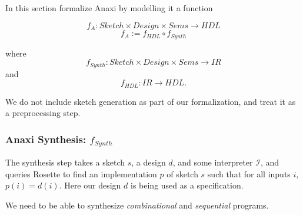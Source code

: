 In this section formalize Anaxi by modelling it a function 

$$f_A : Sketch \times Design \times Sems \to HDL$$
$$f_A := f_{HDL} \circ f_{Synth}$$

where
$$f_{Synth} : Sketch \times Design \times Sems \to IR$$
and
$$f_{HDL} : IR \to HDL.$$

We do not include sketch generation
  as part of our formalization, and treat
  it as a preprocessing step.


\subsubsection{Anaxi Synthesis: $f_{Synth}$}

The synthesis step takes a sketch $s$, a design $d$, and some interpreter $\mathcal{I}$, and queries Rosette to find an implementation $p$ of sketch $s$ such that for all inputs $i$, $p(i) = d(i)$. Here our design $d$ is being used as a specification.

We need to be able to
  synthesize \textit{combinational}
  and \textit{sequential} programs. 

